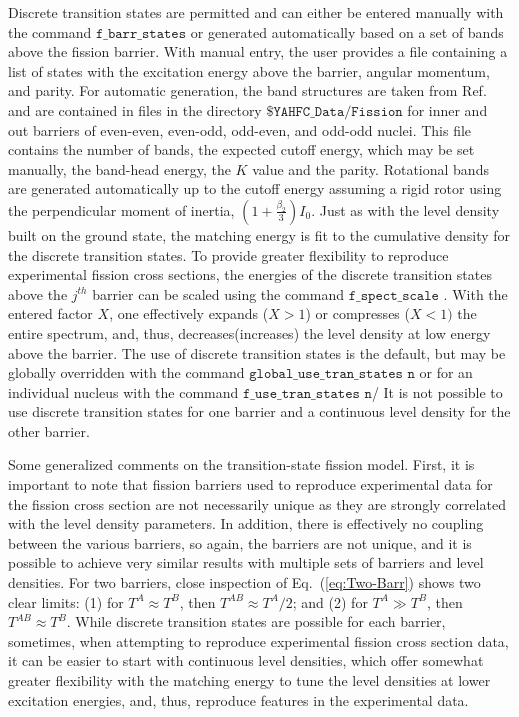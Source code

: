 \documentclass[
10pt,
showpacs,preprintnumbers,footinbib,
amsfonts,amsmath,amssymb,
aps,
prc,twocolumn,groupedaddress,superscriptaddress,
showkeys,
nofootinbib
]{revtex4-1}
\begin{document}
Discrete transition states are permitted and can either be entered manually with the command ${\texttt{f\_barr\_states}}$ or generated automatically based on a set of bands above the fission barrier. With manual entry, the user provides a file containing a list of states with the excitation energy above the barrier, angular momentum, and parity. For automatic generation, the band structures are taken from Ref.~\cite{RIPL-3} and are contained in files in the directory ${\texttt{\$YAHFC\_Data/Fission}}$ for inner and out barriers of even-even, even-odd, odd-even, and odd-odd nuclei. This file contains the number of bands, the expected cutoff energy, which may be set manually, the band-head energy, the $K$ value and the parity. Rotational bands are generated automatically up to the cutoff energy assuming a rigid rotor using the perpendicular moment of inertia, $(1+\frac{\beta_2}{3})I_0$. Just as with the level density built on the ground state, the matching energy is fit to the cumulative density for the discrete transition states. To provide greater flexibility to reproduce experimental fission cross sections, the energies of the discrete transition states above the $j^{th}$ barrier can be scaled using the command ${\texttt{f\_spect\_scale }}$. With the entered factor $X$, one  effectively expands ($X>1$) or compresses ($X<1)$ the entire spectrum, and, thus, decreases(increases) the level density at low energy above the barrier. The use of discrete transition states is the default, but may be globally overridden with the command ${\texttt{global\_use\_tran\_states n}}$ or for an individual nucleus with the command ${\texttt{f\_use\_tran\_states n}}$/ It is not possible to use discrete transition states for one barrier and a continuous level density for the other barrier.

Some generalized comments on the transition-state fission model. First, it is important to note that fission barriers used to reproduce experimental data for the fission cross section are not necessarily unique as they are strongly correlated with the level density parameters. In addition, there is effectively no coupling between the various barriers, so again, the barriers are not unique, and it is possible to achieve very similar results with multiple sets of barriers and level densities. For two barriers, close inspection of Eq.~(\ref{eq:Two-Barr}) shows two clear limits: (1) for $T^A \approx T^B$, then $T^{AB} \approx T^A/2$; and (2) for $T^A \gg T^B$, then $T^{AB} \approx T^B$. While discrete transition states are possible for each barrier, sometimes, when attempting to reproduce experimental fission cross section data, it can be easier to start with continuous level densities, which offer somewhat greater flexibility with the matching energy to tune the level densities at lower excitation energies, and, thus, reproduce features in the experimental data.
\end{document}
